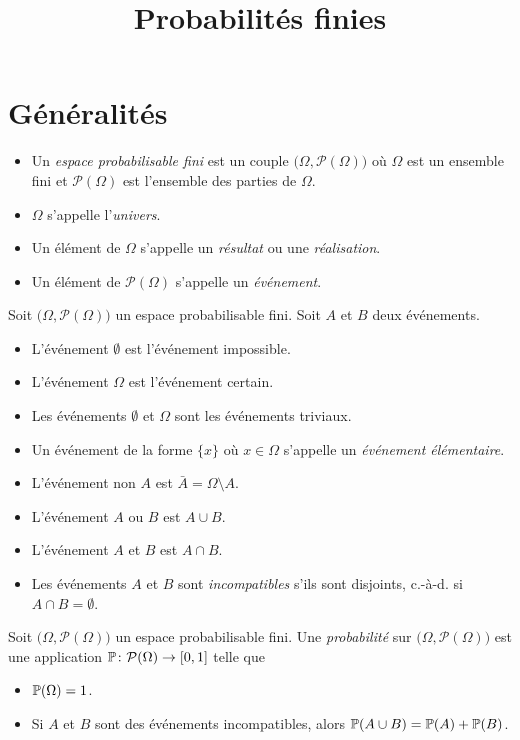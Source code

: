 \documentclass{yann}
\newcommand{\Part}{\mathcal{P}}
\newcommand{\Pro}{\bigl(\Omega, \Part(\Omega)\bigr)}
\begin{document}
\title{Probabilités finies}
\maketitle

\section{Généralités}


\begin{itemize}
\item
Un \emph{espace probabilisable fini} est un couple $\Pro$
  où $\Omega$ est un ensemble fini
  et $\Part(\Omega)$ est l'ensemble des parties de $\Omega$.
\item
$\Omega$ s'appelle l'\emph{univers}.
\item
Un élément de $\Omega$ s'appelle un \emph{résultat} ou une \emph{réalisation}.
\item
Un élément de $\Part(\Omega)$ s'appelle un \emph{événement}.
\end{itemize}


Soit $\Pro$ un espace probabilisable fini.
Soit $A$ et $B$ deux événements.
\begin{itemize}
\item
L'événement $\emptyset$ est l'événement impossible.
\item
L'événement $\Omega$ est l'événement certain.
\item
Les événements $\emptyset$ et $\Omega$ sont les événements triviaux.
\item
Un événement de la forme $\{x\}$ où $x\in\Omega$ s'appelle un \emph{événement élémentaire}.
\item
L'événement \og{}non $A$\fg{} est $\bar A =\Omega\setminus A$.
\item
L'événement \og{}$A$ ou $B$\fg{} est $A\cup B$.
\item
L'événement \og{}$A$ et $B$\fg{} est $A\cap B$.
\item
Les événements $A$ et $B$ sont \emph{incompatibles} s'ils sont disjoints, c.-à-d. si $A\cap B=\emptyset$.
\end{itemize}


Soit $\Pro$ un espace probabilisable fini.
Une \emph{probabilité} sur $\Pro$ est une application
$\Fn{\P}{\Part(\Omega)}{[0,1]}$ telle que
\begin{itemize}
\item
$\P(\Omega)=1$.
\item
Si $A$ et $B$ sont des événements incompatibles,
  alors $\P(A\cup B)=\P(A)+\P(B)$.
\end{itemize}
\end{document}
